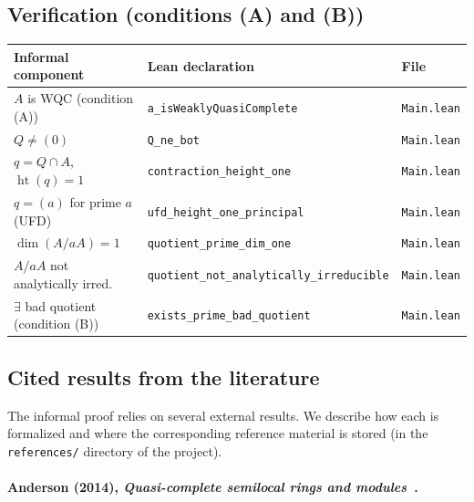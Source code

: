 \documentclass[]{pkuai4m}
\theoremstyle{plain}
\theoremstyle{definition}
\begin{document}
\subsection*{Verification (conditions (A) and (B))}

\begin{center}
\small
\begin{tabular}{p{5.5cm} l l}
\toprule
\textbf{Informal component} & \textbf{Lean declaration} & \textbf{File} \\
\midrule
$A$ is WQC (condition (A)) & \texttt{a\_isWeaklyQuasiComplete} & \texttt{Main.lean} \\
$Q \ne (0)$ & \texttt{Q\_ne\_bot} & \texttt{Main.lean} \\
$q = Q \cap A$, $\operatorname{ht}(q) = 1$ & \texttt{contraction\_height\_one} & \texttt{Main.lean} \\
$q = (a)$ for prime $a$ (UFD) & \texttt{ufd\_height\_one\_principal} & \texttt{Main.lean} \\
$\dim(A/aA) = 1$ & \texttt{quotient\_prime\_dim\_one} & \texttt{Main.lean} \\
$A/aA$ not analytically irred. & \texttt{quotient\_not\_analytically\_irreducible} & \texttt{Main.lean} \\
$\exists$ bad quotient (condition (B)) & \texttt{exists\_prime\_bad\_quotient} & \texttt{Main.lean} \\
\bottomrule
\end{tabular}
\end{center}

\subsection*{Cited results from the literature}

The informal proof relies on several external results. We describe how each is formalized and where the corresponding reference material is stored (in the \texttt{references/} directory of the project).

\paragraph{Anderson (2014), \emph{Quasi-complete semilocal rings and modules}~\cite{anderson2014quasi}.}
\end{document}
